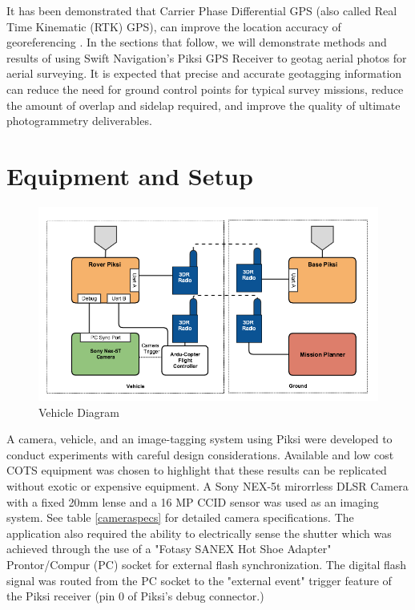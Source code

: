 \documentclass{article}
\begin{document}
It has been demonstrated that Carrier Phase Differential GPS (also called Real Time Kinematic (RTK)
GPS), can improve the location accuracy of georeferencing \cite{sensefly2}.  In the sections that
follow, we will demonstrate methods and results of using Swift Navigation's Piksi GPS Receiver to
geotag aerial photos for aerial surveying.  It is expected that precise and accurate geotagging
information can reduce the need for ground control points for typical survey missions, reduce the
amount of overlap and sidelap required, and improve the quality of ultimate photogrammetry
deliverables.

\section{Equipment and Setup}
\label{sec:equipment}
\begin{figure}[h]
\includegraphics[width=7in]{images/flow_charts/uav_piksi_flow_chart.png}
\caption{Vehicle Diagram}
\label{figure:vehicle-diagram}
\end{figure}

\label{sec:equipment}
A camera, vehicle, and an image-tagging system using Piksi were developed to conduct experiments
with careful design considerations.  Available and low cost COTS equipment was chosen to highlight
that these results can be replicated without exotic or expensive equipment.  A Sony NEX-5t mirorrless DLSR Camera
with a fixed 20mm lense and a 16 MP CCID sensor was used as an imaging system. See table
\ref{cameraspecs} for detailed camera specifications. The application also required the
ability to electrically sense the shutter which was achieved through the use of a "Fotasy SANEX Hot
Shoe Adapter" Prontor/Compur (PC) socket for external flash synchronization.  The digital flash signal was
routed from the PC socket to the "external event" trigger feature of the Piksi receiver (pin 0 of Piksi's debug connector.)
\end{document}
